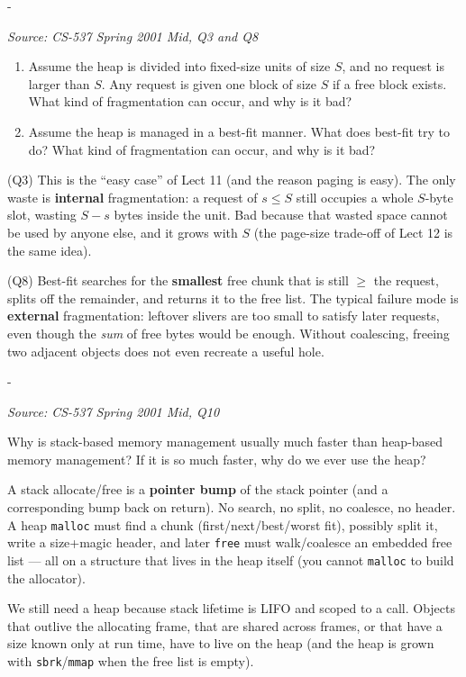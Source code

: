 \documentclass[11pt,a4paper]{article}
\makeatletter
\newcommand{\keepspace}[1]{\par\penalty-100\begingroup
  \setlength{\dimen@}{#1}\dimen@ii\pagegoal\advance\dimen@ii-\pagetotal
  \ifdim\dimen@>\dimen@ii\ifdim\dimen@ii>\z@\vfil\fi\break\fi\endgroup}
\newcounter{qn}[section]
\newenvironment{Qn}[4]{%
  \refstepcounter{qn}\keepspace{7\baselineskip}%
  \begin{tcolorbox}[qboxstyle, title={Q\thesection.\theqn\ \ [#1 \textbar\ #2]\ \ #4}]%
  {\footnotesize\color{g3}\textit{Source: #3}}\par\smallskip%
}{%
  \end{tcolorbox}%
}
\newenvironment{Sol}{%
  \begin{tcolorbox}[sboxstyle, title={Solution}]%
}{%
  \end{tcolorbox}\vspace{0.35em}%
}
\makeatother
\begin{document}
\begin{Qn}{Easy-Medium}{Lect 11}{CS-537 Spring 2001 Mid, Q3 and Q8}{Fixed-size chunks vs.\ best-fit: which fragmentation?}
\begin{enumerate}
  \item Assume the heap is divided into fixed-size units of size $S$,
        and no request is larger than $S$. Any request is given one
        block of size $S$ if a free block exists. What kind of
        fragmentation can occur, and why is it bad?
  \item Assume the heap is managed in a best-fit manner. What does
        best-fit try to do? What kind of fragmentation can occur, and
        why is it bad?
\end{enumerate}
\end{Qn}
\begin{Sol}
(Q3) This is the ``easy case'' of Lect 11 (and the reason paging is
easy). The only waste is \textbf{internal} fragmentation: a request
of $s\le S$ still occupies a whole $S$-byte slot, wasting $S-s$
bytes inside the unit. Bad because that wasted space cannot be used
by anyone else, and it grows with $S$ (the page-size trade-off of
Lect 12 is the same idea).

(Q8) Best-fit searches for the \textbf{smallest} free chunk that is
still $\ge$ the request, splits off the remainder, and returns it to
the free list. The typical failure mode is \textbf{external}
fragmentation: leftover slivers are too small to satisfy later
requests, even though the \emph{sum} of free bytes would be enough.
Without coalescing, freeing two adjacent objects does not even
recreate a useful hole.
\end{Sol}

\begin{Qn}{Easy-Medium}{Lect 11}{CS-537 Spring 2001 Mid, Q10}{Why is stack allocation faster than \texttt{malloc}?}
Why is stack-based memory management usually much faster than
heap-based memory management? If it is so much faster, why do we ever
use the heap?
\end{Qn}
\begin{Sol}
A stack allocate/free is a \textbf{pointer bump} of the stack
pointer (and a corresponding bump back on return). No search, no
split, no coalesce, no header. A heap \texttt{malloc} must find a
chunk (first/next/best/worst fit), possibly split it, write a
size+magic header, and later \texttt{free} must walk/coalesce an
embedded free list --- all on a structure that lives in the heap
itself (you cannot \texttt{malloc} to build the allocator).

We still need a heap because stack lifetime is LIFO and scoped to a
call. Objects that outlive the allocating frame, that are shared
across frames, or that have a size known only at run time, have to
live on the heap (and the heap is grown with \texttt{sbrk}/\texttt{mmap}
when the free list is empty).
\end{Sol}
\end{document}
